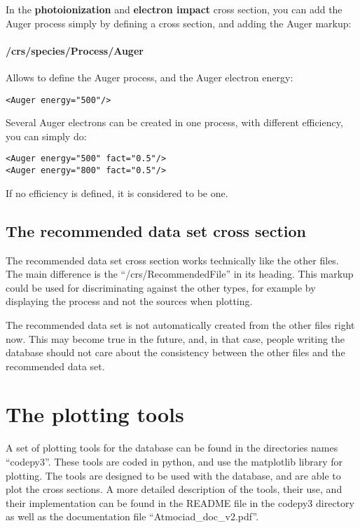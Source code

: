 In the \textbf{photoionization} and \textbf{electron impact} cross section, you can add the Auger process simply by defining a cross section, and adding the Auger markup:

\paragraph{/crs/species/Process/Auger}
Allows to define the Auger process, and the Auger electron energy:
\begin{verbatim}
<Auger energy="500"/>
\end{verbatim}


Several Auger electrons can be created in one process, with different efficiency, you can simply do:

\begin{verbatim}
<Auger energy="500" fact="0.5"/>
<Auger energy="800" fact="0.5"/>
\end{verbatim}

If no efficiency is defined, it is considered to be one.


\subsection{The recommended data set cross section}

The recommended data set cross section works technically like the other files.
The main difference is the ``/crs/RecommendedFile'' in its heading.
This markup could be used for discriminating against the other types, for example by displaying the process and 
not the sources when plotting. 

The recommended data set is not automatically created from the other files right now. This may become true in the future, and, in that case, people writing the database should not care about the consistency between the other files and the recommended data set.



\section{The plotting tools}
\label{autoplottingsystem}
A set of plotting tools for the database can be found in the directories names ``codepy3''. These tools are coded in python, and use the matplotlib library for plotting. The tools are designed to be used with the database, and are able to plot the cross sections.
A more detailed description of the tools, their use, and their implementation can be found in the README file in the codepy3 directory as well as the documentation file ``Atmociad\_doc\_v2.pdf''.

